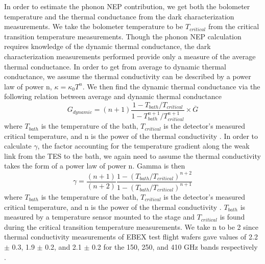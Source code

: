 In order to estimate the phonon \ac{NEP} contribution, we get both the bolometer temperature and the thermal conductance from the dark characterization measurements. 
We take the bolometer temperature to be $T_{critical}$ from the critical transition temperature measurements. 
Though the phonon \ac{NEP} calculation requires knowledge of the dynamic thermal conductance, the dark characterization measurements performed provide only a measure of the average thermal conductance. 
In order to get from average to dynamic thermal conductance, we assume the thermal conductivity can be described by a power law of power n, $\kappa = \kappa_{0} T^{n}$.
We then find the dynamic thermal conductance via the following relation between average and dynamic thermal conductance
\begin{equation}
G_{dynamic} = (n+1) \frac{1 - T_{bath}/T_{critical}}{1 - T_{bath}^{n+1}/T_{critical}^{n+1}} \times \overline{G}
\end{equation}
where $T_{bath}$ is the temperature of the bath, $T_{critical}$ is the detector's measured critical temperature, and n is the power of the thermal conductivity \cite{Mather1982}. 
In order to calculate $\gamma$, the factor accounting for the temperature gradient along the weak link from the TES to the bath, we again need to assume the thermal conductivity takes the form of a power law of power n. 
Gamma is then
\begin{equation}
\gamma = \frac{(n+1)}{(n+2)} \frac{1 - (T_{bath}/T_{critical})^{n+2}}{1 - (T_{bath}/T_{critical})^{n+1}}
\end{equation}
where $T_{bath}$ is the temperature of the bath, $T_{critical}$ is the detector's measured critical temperature, and n is the power of the thermal conductivity \cite{Mather1982}. 
$T_{bath}$ is measured by a temperature sensor mounted to the stage and $T_{critical}$ is found during the critical transition temperature measurements.
We take n to be 2 since thermal conductivity measurements of \ac{EBEX} test flight wafers gave values of 2.2 $\pm$ 0.3, 1.9 $\pm$ 0.2, and 2.1 $\pm$ 0.2 for the 150, 250, and 410 GHz bands respectively \cite{Hubmayr2009}.

